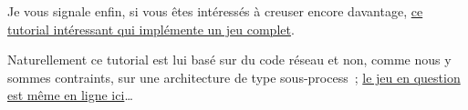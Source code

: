 Je vous signale enfin, si vous êtes intéressés à creuser encore
davantage,
\href{https://7webpages.com/blog/writing-online-multiplayer-game-with-python-asyncio-getting-asynchronous/}{ce
tutorial intéressant qui implémente un jeu complet}.

Naturellement ce tutorial est lui basé sur du code réseau et non, comme
nous y sommes contraints, sur une architecture de type sous-process~;
\href{http://snakepit-game.com/}{le jeu en question est même en ligne
ici}\ldots{}


    
    
    
